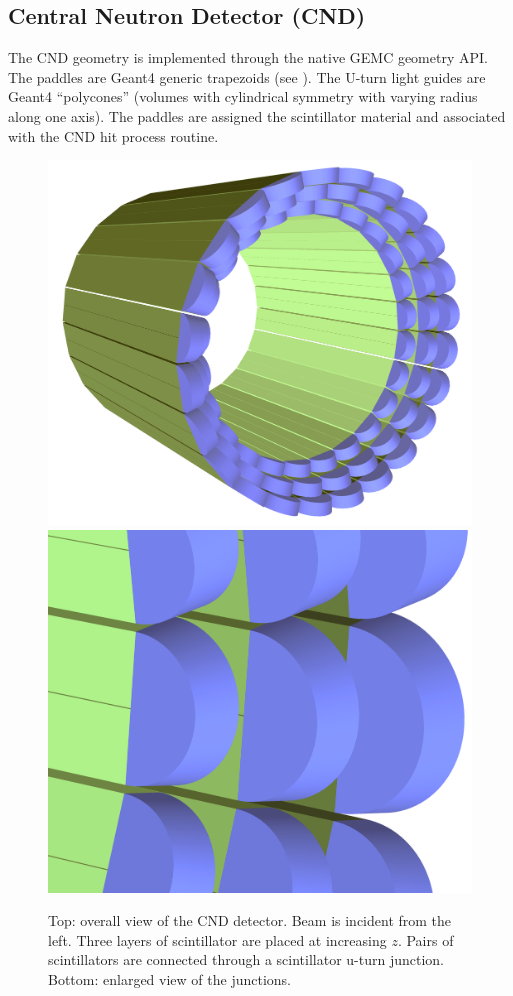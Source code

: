 \subsection{Central Neutron Detector (CND)}

The CND geometry is implemented through the native GEMC geometry API. The paddles are Geant4 generic trapezoids
(see ). The U-turn light guides are Geant4 ``polycones'' (volumes with cylindrical symmetry with varying
radius along one axis). The paddles are assigned the scintillator material and associated with the CND hit process routine.

\begin{figure}
	\centering
	\includegraphics[width=0.99\columnwidth,keepaspectratio]{img/cndGeometry.png}
	\includegraphics[width=0.99\columnwidth,keepaspectratio]{img/cndDetail.png}
	\caption{Top: overall view of the CND detector. Beam is incident from the left.
	         Three layers of scintillator are placed at increasing $z$. Pairs of scintillators
             are connected through a scintillator u-turn junction. Bottom: enlarged view of the junctions. }
	\label{fig:cndGeometry}
\end{figure}

